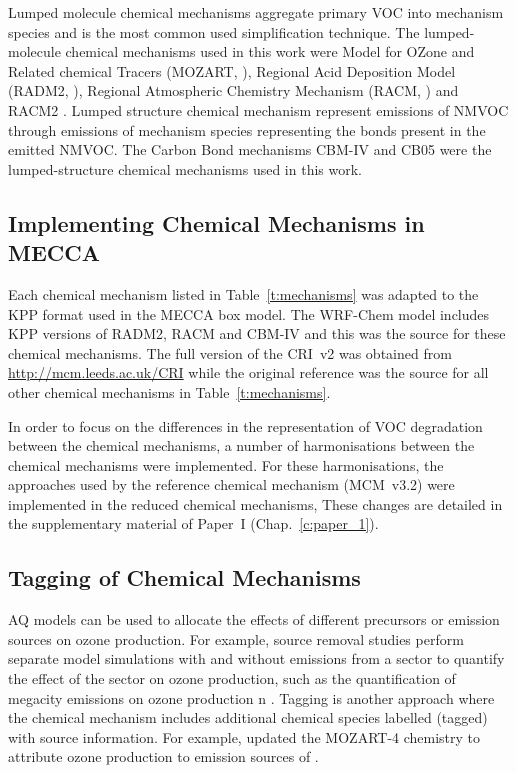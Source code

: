 Lumped molecule chemical mechanisms aggregate primary VOC into mechanism species and is the most common used simplification technique.
The lumped-molecule chemical mechanisms used in this work were Model for OZone and Related chemical Tracers (MOZART, \citet{Emmons:2010}), Regional Acid Deposition Model (RADM2, \citet{Stockwell:1990}), Regional Atmospheric Chemistry Mechanism (RACM, \citet{Stockwell:1997}) and RACM2 \citet{Goliff:2013}.
Lumped structure chemical mechanism represent emissions of NMVOC through emissions of mechanism species representing the bonds present in the emitted NMVOC.
The Carbon Bond mechanisms CBM-IV \citep{Gery:1989} and CB05 \citep{Yarwood:2005} were the lumped-structure chemical mechanisms used in this work.

\subsection{Implementing Chemical Mechanisms in MECCA} \label{s:mechanisms_MECCA}
Each chemical mechanism listed in Table~\ref{t:mechanisms} was adapted to the KPP format used in the MECCA box model.
The WRF-Chem model \citep{Grell:2005} includes KPP versions of RADM2, RACM and CBM-IV and this was the source for these chemical mechanisms.
The full version of the CRI~v2 was obtained from \mbox{\url{http://mcm.leeds.ac.uk/CRI}} while the original reference was the source for all other chemical mechanisms in Table~\ref{t:mechanisms}.

In order to focus on the differences in the representation of VOC degradation between the chemical mechanisms, a number of harmonisations between the chemical mechanisms were implemented.
For these harmonisations, the approaches used by the reference chemical mechanism (MCM~v3.2) were implemented in the reduced chemical mechanisms,
These changes are detailed in the supplementary material of Paper~I (Chap.~\ref{c:paper_1}). 

\subsection{Tagging of Chemical Mechanisms} \label{s:tagging}
AQ models can be used to allocate the effects of different precursors or emission sources on ozone production.
For example, source removal studies perform separate model simulations with and without emissions from a sector to quantify the effect of the sector on ozone production, such as the quantification of megacity emissions on ozone production n \citet{Butler:2009}.
Tagging is another approach where the chemical mechanism includes additional chemical species labelled (tagged) with source information.
For example, \citet{Emmons:2012} updated the MOZART-4 chemistry to attribute ozone production to emission sources of .

